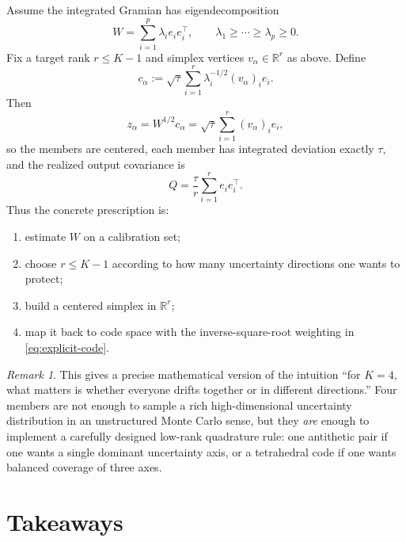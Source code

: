 \documentclass[11pt]{article}
\newcommand{\R}{\mathbb{R}}
\theoremstyle{remark}
\newtheorem{remark}[theorem]{Remark}
\begin{document}
Assume the integrated Gramian has eigendecomposition
\[
W=\sum_{i=1}^p \lambda_i e_i e_i^\top,
\qquad
\lambda_1\ge\cdots\ge\lambda_p\ge 0.
\]
Fix a target rank $r\le K-1$ and simplex vertices $v_\alpha\in\R^r$ as above. Define
\begin{equation}
c_\alpha
:=
\sqrt{\tau}
\sum_{i=1}^r \lambda_i^{-1/2} (v_\alpha)_i e_i.
\label{eq:explicit-code}
\end{equation}
Then
\[
z_\alpha = W^{1/2}c_\alpha = \sqrt{\tau}\sum_{i=1}^r (v_\alpha)_i e_i,
\]
so the members are centered, each member has integrated deviation exactly $\tau$, and the realized output covariance is
\[
Q=\frac{\tau}{r}\sum_{i=1}^r e_i e_i^\top.
\]
Thus the concrete prescription is:
\begin{enumerate}
\item estimate $W$ on a calibration set;
\item choose $r\le K-1$ according to how many uncertainty directions one wants to protect;
\item build a centered simplex in $\R^r$;
\item map it back to code space with the inverse-square-root weighting in \eqref{eq:explicit-code}.
\end{enumerate}

\begin{remark}
This gives a precise mathematical version of the intuition ``for $K=4$, what matters is whether everyone drifts together or in different directions.'' Four members are not enough to sample a rich high-dimensional uncertainty distribution in an unstructured Monte Carlo sense, but they \emph{are} enough to implement a carefully designed low-rank quadrature rule: one antithetic pair if one wants a single dominant uncertainty axis, or a tetrahedral code if one wants balanced coverage of three axes.
\end{remark}

\section{Takeaways}
\end{document}
